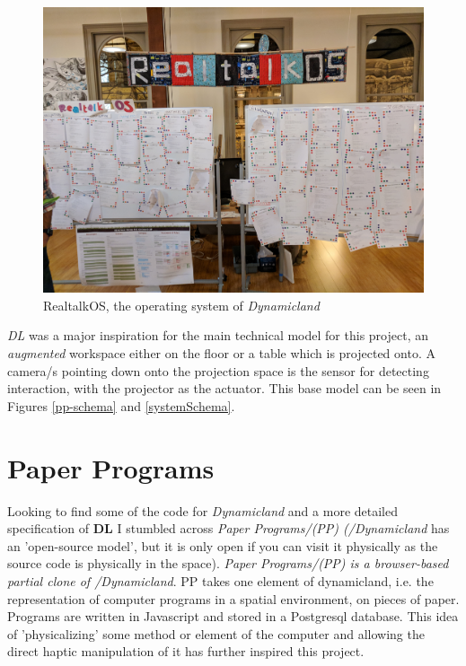 \documentclass[12pt]{report}
\begin{document}
\begin{figure}[htbp]
\centering
\includegraphics[width=12cm]{assets/realtalk-os.jpg}
\caption{RealtalkOS, the operating system of \emph{Dynamicland}}
\end{figure}  


\emph{DL} was a major inspiration for the main technical model for this project, an
\emph{augmented} workspace either on the floor or a table which is projected onto. A
camera/s pointing down onto the projection space is the sensor for detecting
interaction, with the projector as the actuator. This base model can be seen in
Figures \ref{pp-schema} and \ref{systemSchema}.

\section{Paper Programs}
\label{sec:orgcdf2239}

Looking to find some of the code for \emph{Dynamicland} and a more detailed
specification of \textbf{DL} I stumbled across \emph{Paper Programs/(PP) (/Dynamicland} has
an 'open-source model', but it is only open if you can visit it physically as
the source code is physically in the space). \emph{Paper Programs/(PP) is a browser-based
partial clone of /Dynamicland}. PP takes one element of dynamicland, i.e. the
representation of computer programs in a spatial environment, on pieces of
paper. Programs are written in Javascript and stored in a Postgresql database.
This idea of 'physicalizing' some method or element of the computer and allowing
the direct haptic manipulation of it has further inspired this project. \\
\end{document}
